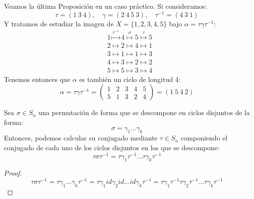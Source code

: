 \begin{ejemplo}
    Veamos la última Proposición en un caso práctico. Si consideramos:
    \begin{equation*}
        \tau = (1\ 3\ 4), \quad \gamma = (2\ 4\ 5\ 3), \quad \tau^{-1} = (4\ 3\ 1)
    \end{equation*}
    Y tratamos de estudiar la imagen de $X=\{1,2,3,4,5\}$ bajo $\alpha=\tau\gamma\tau^{-1}$:
    \begin{align*}
        &1 \stackrel{\tau^{-1}}{\longmapsto} 4 \stackrel{\sigma}{\longmapsto} 5 \stackrel{\tau}{\longmapsto} 5 \\
        &2 \longmapsto2 \longmapsto 4 \longmapsto 1 \\
        &3 \longmapsto1 \longmapsto1 \longmapsto 3 \\
        &4 \longmapsto 3 \longmapsto 2 \longmapsto 2 \\
        &5\longmapsto 5 \longmapsto 3 \longmapsto 4
    \end{align*} 
    Tenemos entonces que $\alpha$ es también un ciclo de longitud 4:
    \begin{equation*}
        \alpha=\tau\gamma\tau^{-1} = \left(\begin{array}{ccccc}
            1 & 2 & 3 & 4 & 5 \\
            5 & 1 & 3 & 2 & 4 
        \end{array}\right) = (1\ 5\ 4\ 2)
    \end{equation*}
\end{ejemplo}

\begin{prop}
    Sea $\sigma\in S_n$ una permutación de forma que se descompone en ciclos disjuntos de la forma:
    \begin{equation*}
        \sigma = \gamma_1\ldots\gamma_k
    \end{equation*}
    Entonces, podemos calcular su conjugado mediante $\tau\in S_n$ componiendo el conjugado de cada uno de los ciclos disjuntos en los que se descompone:
    \begin{equation*}
        \tau\sigma\tau^{-1} = \tau\gamma_1\tau^{-1}\ldots \tau\gamma_k\tau^{-1}
    \end{equation*}
    \begin{proof}
        \begin{equation*}
            \tau\sigma\tau^{-1} = \tau\gamma_1\ldots\gamma_k\tau^{-1} = \tau \gamma_1 id \gamma_2 id \ldots id \gamma_k \tau^{-1} = \tau\gamma_1\tau^{-1}\tau \gamma_2 \tau^{-1} \ldots \tau\gamma_k\tau^{-1}
        \end{equation*}
    \end{proof}
\end{prop}

